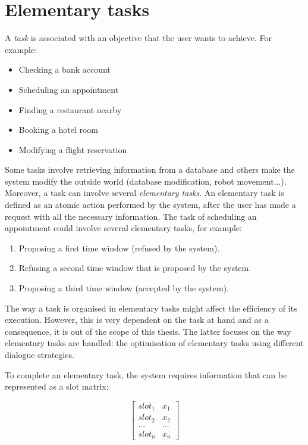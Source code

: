 \section{Elementary tasks}
\label{sec:elemtask}

	A \textit{task} is associated with an objective that the user wants to achieve. For example:
	
	\begin{itemize}
		\item Checking a bank account
		\item Scheduling an appointment
		\item Finding a restaurant nearby
		\item Booking a hotel room
		\item Modifying a flight reservation
	\end{itemize}
	
	Some tasks involve retrieving information from a database and others make the system modify the outside world (database modification, robot movement...). Moreover, a task can involve several \textit{elementary tasks}. An elementary task is defined as an atomic action performed by the system, after the user has made a request with all the necessary information. The task of scheduling an appointment could involve several elementary tasks, for example:
	
	\begin{enumerate}
		\item Proposing a first time window (refused by the system).
		\item Refusing a second time window that is proposed by the system.
		\item Proposing a third time window (accepted by the system).
	\end{enumerate}
	
	The way a task is organised in elementary tasks might affect the efficiency of its execution. However, this is very dependent on the task at hand and as a consequence, it is out of the scope of this thesis. The latter focuses on the way elementary tasks are handled: the optimisation of elementary tasks using different dialogue strategies.
	
	To complete an elementary task, the system requires information that can be represented as a slot matrix:
	
		$$
		\begin{bmatrix}
			slot_1 & x_1 \\
			slot_2 & x_2 \\
			... & ... \\
			slot_n & x_n
		\end{bmatrix}
		$$
	
